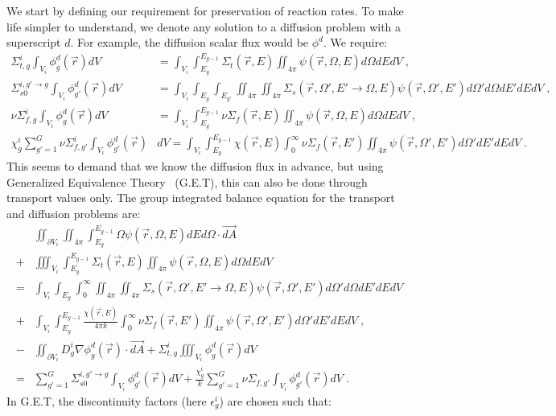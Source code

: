 \documentclass[a4paper,letterpaper,12pt,oneside,draft]{article}
\newcommand{\eec}{\;,}
\newcommand{\eep}{\;.}
\newcommand{\intg}[2][g]{\ensuremath{\int_{E_{#1}}^{E_{#1-1}} #2 dE}}
\newcommand{\vr}{\ensuremath{\vec{r}}}
\newcommand{\psif}[1][]{\psi(\vr,\Omega#1,E#1)}
\begin{document}
    We start by defining our requirement for preservation of reaction rates. To make life simpler to understand, we denote any solution to a diffusion problem with a superscript $d$. For example, the diffusion scalar flux would be $\phi^d$.
    We require:
    \begin{align}
    \label{eq:ReacRate}
        \Sigma_{t,g}^i\int_{V_i} \phi_g^d(\vr)dV &= \int_{V_i}\intg{\Sigma_{t}(\vr,E)\iint_{4\pi}\psif d\Omega}dV \eec\\\nonumber
        \Sigma_{s0}^{i,g'\to g}\int_{V_i} \phi_{g'}^d(\vr)dV &= \int_{V_i}\int_{E_g}\int_{E_{g'}}\iint_{4\pi}\iint_{4\pi} \Sigma_{s}(\vr,\Omega',E'\to\Omega,E) \psif['] d\Omega'd\Omega dE'dEdV \eec\\\nonumber
        \nu\Sigma_{f,g}^i\int_{V_i} \phi_g^d(\vr)dV &= \int_{V_i}\intg{\nu\Sigma_{f}(\vr,E)\iint_{4\pi}\psif d\Omega}dV \eec\\\nonumber
        \chi_g^i\sum_{g'=1}^G\nu\Sigma_{f,g'}^i\int_{V_i} \phi_{g'}^d(\vr)&dV = \int_{V_i}\intg{\chi(\vr,E)\int_0^\infty\nu\Sigma_{f}(\vr,E')\iint_{4\pi}\psif['] d\Omega'dE'}dV\eep
    \end{align}
    This seems to demand that we know the diffusion flux in advance, but using Generalized Equivalence Theory~\cite{SmithHomogenization} (G.E.T), this can also be done through transport values only.
    The group integrated balance equation for the transport and diffusion problems are:
    \begin{align}
    \label{eq:BTE:Balance}
        &\iint_{\partial V_i}\iint_{4\pi}\intg{\Omega\psif} d\Omega\cdot\vec{dA} \\\nonumber
        +& \iiint_{V_i}\intg{\Sigma_{t}(\vr,E)\iint_{4\pi}\psif d\Omega}dV \\\nonumber
        =& \int_{V_i}\int_{E_g}\int_{0}^\infty\iint_{4\pi}\iint_{4\pi} \Sigma_{s}(\vr,\Omega',E'\to\Omega,E) \psif['] d\Omega'd\Omega dE'dEdV \\\nonumber
        +& \int_{V_i}\intg{\frac{\chi(\vr,E)}{4\pi k} \int_0^\infty\nu\Sigma_{f}(\vr,E')\iint_{4\pi}\psif['] d\Omega'dE'}dV \eec\\
    \label{eq:DE:Balance}
        -&\iint_{\partial V_i}D_g^i\nabla\phi_g^d(\vr) \cdot\vec{dA} + \Sigma_{t,g}^i\iiint_{V_i}\phi_g^d(\vr)dV \\\nonumber
        =& \sum_{g'=1}^G\Sigma_{s0}^{i,g'\to g}\int_{V_i}\phi_{g'}^d(\vr)dV
        + \frac{\chi_g^i}{k}\sum_{g'=1}^G\nu\Sigma_{f,g'}\int_{V_i}\phi_{g'}^d(\vr)dV \eep
    \end{align}
    In G.E.T, the discontinuity factors (here $\epsilon_{g}^i$) are chosen such that:
\end{document}
